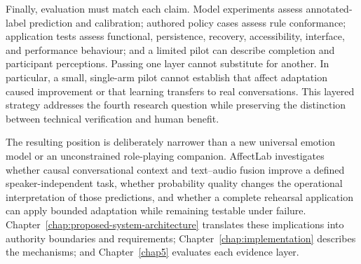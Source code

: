 Finally, evaluation must match each claim. Model experiments assess annotated-label prediction and calibration; authored policy cases assess rule conformance; application tests assess functional, persistence, recovery, accessibility, interface, and performance behaviour; and a limited pilot can describe completion and participant perceptions. Passing one layer cannot substitute for another. In particular, a small, single-arm pilot cannot establish that affect adaptation caused improvement or that learning transfers to real conversations. This layered strategy addresses the fourth research question while preserving the distinction between technical verification and human benefit.

The resulting position is deliberately narrower than a new universal emotion model or an unconstrained role-playing companion. AffectLab investigates whether causal conversational context and text--audio fusion improve a defined speaker-independent task, whether probability quality changes the operational interpretation of those predictions, and whether a complete rehearsal application can apply bounded adaptation while remaining testable under failure. Chapter~\ref{chap:proposed-system-architecture} translates these implications into authority boundaries and requirements; Chapter~\ref{chap:implementation} describes the mechanisms; and Chapter~\ref{chap5} evaluates each evidence layer.
